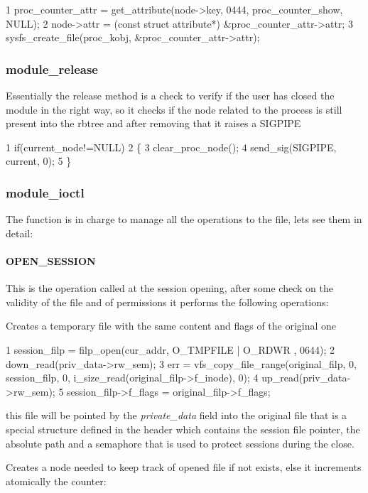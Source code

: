 \begin{DoxyCode}
1 proc\_counter\_attr = get\_attribute(node->key, 0444, proc\_counter\_show, NULL);
2     node->attr = (const struct attribute*) &proc\_counter\_attr->attr;
3     sysfs\_create\_file(proc\_kobj, &proc\_counter\_attr->attr);
\end{DoxyCode}


\subsubsection*{module\+\_\+release}

Essentially the release method is a check to verify if the user has closed the module in the right way, so it checks if the node related to the process is still present into the rbtree and after removing that it raises a S\+I\+G\+P\+I\+PE 
\begin{DoxyCode}
1 if(current\_node!=NULL)
2 \{
3     clear\_proc\_node();                  
4     send\_sig(SIGPIPE, current, 0);
5 \}
\end{DoxyCode}


\subsubsection*{module\+\_\+ioctl}

The function is in charge to manage all the operations to the file, let\textquotesingle{}s see them in detail\+:

\paragraph*{O\+P\+E\+N\+\_\+\+S\+E\+S\+S\+I\+ON}

This is the operation called at the session opening, after some check on the validity of the file and of permissions it performs the following operations\+:


\begin{DoxyItemize}
\item Creates a temporary file with the same content and flags of the original one
\end{DoxyItemize}


\begin{DoxyCode}
1 session\_filp = filp\_open(cur\_addr, O\_TMPFILE | O\_RDWR  , 0644);
2 down\_read(priv\_data->rw\_sem);
3 err = vfs\_copy\_file\_range(original\_filp, 0, session\_filp, 0, i\_size\_read(original\_filp->f\_inode), 0);
4 up\_read(priv\_data->rw\_sem);
5 session\_filp->f\_flags = original\_filp->f\_flags;
\end{DoxyCode}
 this file will be pointed by the {\itshape private\+\_\+data} field into the original file that is a special structure defined in the header which contains the session file pointer, the absolute path and a semaphore that is used to protect sessions during the close.
\begin{DoxyItemize}
\item Creates a node needed to keep track of opened file if not exists, else it increments atomically the counter\+:
\end{DoxyItemize}


